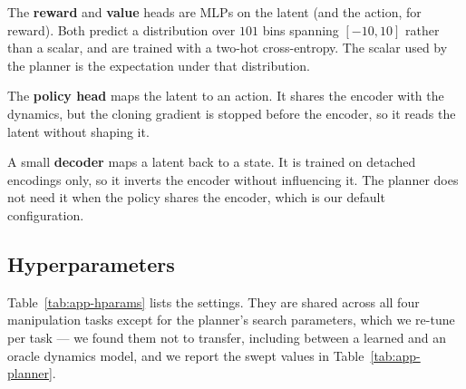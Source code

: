 The \textbf{reward} and \textbf{value} heads are MLPs on the latent (and the
action, for reward). Both predict a distribution over $101$ bins spanning
$[-10, 10]$ rather than a scalar, and are trained with a two-hot cross-entropy.
The scalar used by the planner is the expectation under that distribution.

The \textbf{policy head} maps the latent to an action. It shares the encoder with
the dynamics, but the cloning gradient is stopped before the encoder, so it reads
the latent without shaping it.

A small \textbf{decoder} maps a latent back to a state. It is trained on
detached encodings only, so it inverts the encoder without influencing it. The
planner does not need it when the policy shares the encoder, which is our default
configuration.

\subsection{Hyperparameters}
\label{app:hparams}

Table~\ref{tab:app-hparams} lists the settings. They are shared across all four
manipulation tasks except for the planner's search parameters, which we re-tune
per task --- we found them not to transfer, including between a learned and an
oracle dynamics model, and we report the swept values in
Table~\ref{tab:app-planner}.

